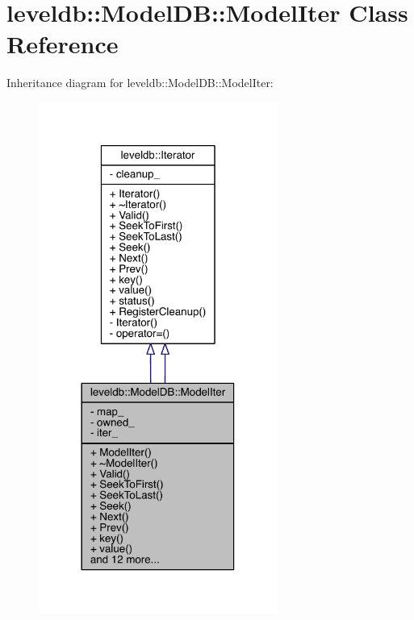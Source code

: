 \hypertarget{classleveldb_1_1_model_d_b_1_1_model_iter}{}\section{leveldb\+:\+:Model\+D\+B\+:\+:Model\+Iter Class Reference}
\label{classleveldb_1_1_model_d_b_1_1_model_iter}


Inheritance diagram for leveldb\+:\+:Model\+D\+B\+:\+:Model\+Iter\+:\nopagebreak
\begin{figure}[H]
\begin{center}
\leavevmode
\includegraphics[width=222pt]{classleveldb_1_1_model_d_b_1_1_model_iter__inherit__graph}
\end{center}
\end{figure}


